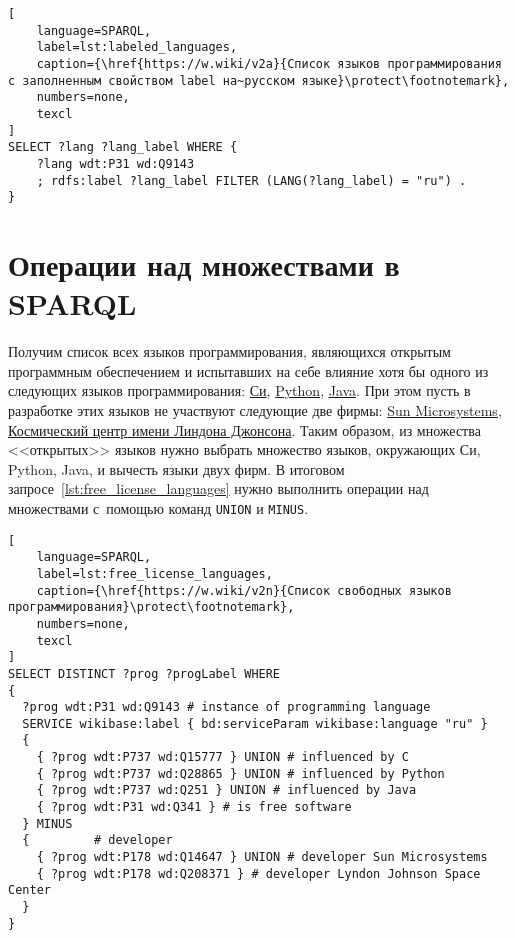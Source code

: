 \newpage
\begin{lstlisting}[
	language=SPARQL,
	label=lst:labeled_languages,
	caption={\href{https://w.wiki/v2a}{Список языков программирования с заполненным свойством label на~русском языке}\protect\footnotemark},
    numbers=none,
	texcl
]
SELECT ?lang ?lang_label WHERE {
    ?lang wdt:P31 wd:Q9143
    ; rdfs:label ?lang_label FILTER (LANG(?lang_label) = "ru") . 
}
\end{lstlisting}




\section{Операции над множествами в SPARQL}
Получим список всех языков программирования, 
являющихся открытым программным обеспечением %
и испытавших на себе влияние хотя бы одного из следующих языков программирования: 
\href{https://en.wikipedia.org/wiki/C_(programming_language)}{Си}, 
\href{https://ru.wikipedia.org/wiki/Python}{Python}, 
\href{https://ru.wikipedia.org/wiki/Java}{Java}. 
При этом пусть в разработке этих языков не участвуют следующие две фирмы: 
\href{https://ru.wikipedia.org/wiki/Sun_Microsystems}{Sun Microsystems}, 
\href{https://en.wikipedia.org/wiki/Johnson_Space_Center}{Космический центр имени Линдона Джонсона}. 
Таким образом, из множества <<открытых>> языков 
нужно выбрать множество языков, окружающих Си, Python, Java, 
и вычесть языки двух фирм. 
В итоговом запросе~\ref{lst:free_license_languages} 
нужно выполнить операции над множествами с~помощью команд \texttt{UNION} и \texttt{MINUS}. 


\begin{lstlisting}[
	language=SPARQL,
	label=lst:free_license_languages,
	caption={\href{https://w.wiki/v2n}{Список свободных языков программирования}\protect\footnotemark},
    numbers=none,
	texcl
]
SELECT DISTINCT ?prog ?progLabel WHERE
{
  ?prog wdt:P31 wd:Q9143 # instance of programming language
  SERVICE wikibase:label { bd:serviceParam wikibase:language "ru" } 
  {
    { ?prog wdt:P737 wd:Q15777 } UNION # influenced by C
    { ?prog wdt:P737 wd:Q28865 } UNION # influenced by Python
    { ?prog wdt:P737 wd:Q251 } UNION # influenced by Java
    { ?prog wdt:P31 wd:Q341 } # is free software
  } MINUS
  {         # developer
    { ?prog wdt:P178 wd:Q14647 } UNION # developer Sun Microsystems
    { ?prog wdt:P178 wd:Q208371 } # developer Lyndon Johnson Space Center
  }
}
\end{lstlisting}



